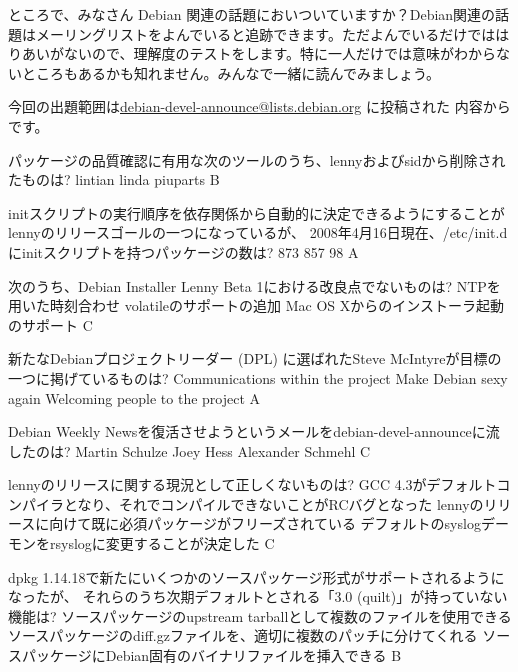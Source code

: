 \documentclass[mingoth,a4paper]{jsarticle}
\begin{document}
ところで、みなさん Debian 関連の話題においついていますか？Debian関連の話
題はメーリングリストをよんでいると追跡できます。ただよんでいるだけではは
りあいがないので、理解度のテストをします。特に一人だけでは意味がわからな
いところもあるかも知れません。みんなで一緒に読んでみましょう。

今回の出題範囲は\url{debian-devel-announce@lists.debian.org} に投稿された
内容からです。
\begin{multicols}{2}
 
 \santaku
 {パッケージの品質確認に有用な次のツールのうち、lennyおよびsidから削除されたものは?}
 {lintian}
 {linda}
 {piuparts}
 {B}
 
 \santaku
 {initスクリプトの実行順序を依存関係から自動的に決定できるようにすることがlennyのリリースゴールの一つになっているが、
 2008年4月16日現在、/etc/init.dにinitスクリプトを持つパッケージの数は?}
 {873}%
 {857}%
 {98}%
 {A}
 
 \santaku
 {次のうち、Debian Installer Lenny Beta 1における改良点でないものは?}
 {NTPを用いた時刻合わせ}
 {volatileのサポートの追加}
 {Mac OS Xからのインストーラ起動のサポート}
 {C}
 
 \santaku
 {新たなDebianプロジェクトリーダー (DPL) に選ばれたSteve McIntyreが目標の一つに掲げているものは?}
 {Communications within the project}%
 {Make Debian sexy again}%
 {Welcoming people to the project}%
 {A}
 
 \santaku
 {Debian Weekly Newsを復活させようというメールをdebian-devel-announceに流したのは?}
 {Martin Schulze}
 {Joey Hess}
 {Alexander Schmehl}
 {C}
 
 \santaku
 {lennyのリリースに関する現況として正しくないものは?}
 {GCC 4.3がデフォルトコンパイラとなり、それでコンパイルできないことがRCバグとなった}
 {lennyのリリースに向けて既に必須パッケージがフリーズされている}
 {デフォルトのsyslogデーモンをrsyslogに変更することが決定した}%
 {C}
 
 \santaku
 {dpkg 1.14.18で新たにいくつかのソースパッケージ形式がサポートされるようになったが、
 それらのうち次期デフォルトとされる「3.0 (quilt)」が持っていない機能は?}
 {ソースパッケージのupstream tarballとして複数のファイルを使用できる}
 {ソースパッケージのdiff.gzファイルを、適切に複数のパッチに分けてくれる}
 {ソースパッケージにDebian固有のバイナリファイルを挿入できる}
 {B}
 

\end{multicols}
\end{document}
